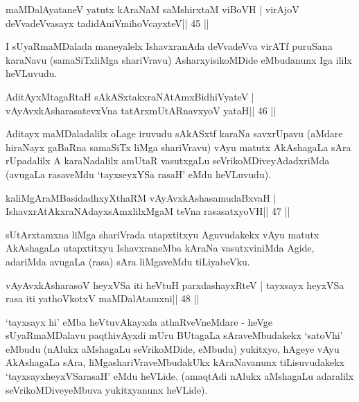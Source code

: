 \begin{shl}
maMDalAyataneV yatutx kAraNaM saMshirxtaM viBoVH |
virAjoV deVvadeVvasayx tadidAniVmihoVcayxteV\hfill || 45 ||
\end{shl}

\begin{artha}
I sUyaRmaMDalada maneyalelx IshavxranAda deVvadeVva virATf puruSana karaNavu (samaSiTxliMga shariVravu) AsharxyisikoMDide eMbudanunx Iga ililx heVLuvudu.
\end{artha}

\begin{shl}
AditAyxMtagaRtaH sAkASxtakxraNAtAmx\s BidhiVyateV |
vAyAvxkAsharasatevxVna tatArxmUtARnavxyoV yataH\hfill || 46 ||
\end{shl}

\begin{artha}
Aditayx maMDaladalilx oLage iruvudu sAkASxtf karaNa savxrUpavu (aMdare hiraNayx gaBaRna samaSiTx liMga shariVravu) vAyu matutx AkAshagaLa sAra rUpadalilx A karaNadalilx amUtaR vasutxgaLu seVrikoMDiveyAdadxriMda (avugaLa rasaveMdu `tayxseyxYSa rasaH' eMdu heVLuvudu).
\end{artha}

\begin{shl}
kaliMgAraMBasidadhxyXthaRM vAyAvxkAshasamudaBxvaH |
IshavxrAtAkxraNAdayxsAmxlilxMgaM teVna rasasatxyoVH\hfill || 47 ||
\end{shl}

\begin{artha}
sUtArxtamxna liMga shariVrada utapxtitxyu Aguvudakekx vAyu matutx AkAshagaLa utapxtitxyu IshavxraneMba kAraNa vasutxviniMda Agide, adariMda avugaLa (rasa) sAra liMgaveMdu tiLiyabeVku.
\end{artha}

\begin{shl}
vAyAvxkAsharasoV heyxVSa iti heVtuH parxdashayxRteV |
tayxsayx heyxVSa rasa iti yathoVkotxV maMDalAtamxni\hfill || 48 ||
\end{shl}

\begin{artha}
`tayxsayx hi' eMba heVtuvAkayxda athaRveVneMdare - heVge sUyaRmaMDalavu paqthivAyxdi mUru BUtagaLa sAraveMbudakekx `satoVhi' eMbudu (nAlukx aMshagaLu seVrikoMDide, eMbudu) yukitxyo, hAgeye vAyu AkAshagaLa sAra, liMgashariVraveMbudakUkx kAraNavanunx tiLisuvudakekx `tayxsayxheyxVSarasaH' eMdu heVLide. (amaqtAdi nAlukx aMshagaLu adaralilx seVrikoMDiveyeMbuva yukitxyanunx heVLide).
\end{artha}

